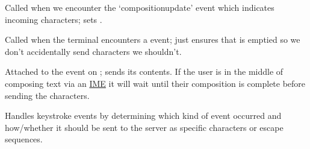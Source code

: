 \documentclass[letterpaper,10pt,openany]{sphinxmanual}
\begin{document}
\begin{fulllineitems}
\begin{fulllineitems}
\end{fulllineitems}



\begin{fulllineitems}
\label{Applications/terminal/js_terminal_input:GateOne.Terminal.Input.onCompositionUpdate}
Called when we encounter the `compositionupdate' event which indicates incoming characters; sets .

\end{fulllineitems}



\begin{fulllineitems}
\label{Applications/terminal/js_terminal_input:GateOne.Terminal.Input.onKeyUp}
Called when the terminal encounters a  event; just ensures that  is emptied so we don't accidentally send characters we shouldn't.

\end{fulllineitems}



\begin{fulllineitems}
\label{Applications/terminal/js_terminal_input:GateOne.Terminal.Input.onInput}
Attached to the  event on ; sends its contents.  If the user is in the middle of composing text via an \href{http://en.wikipedia.org/wiki/Input\_method}{IME} it will wait until their composition is complete before sending the characters.

\end{fulllineitems}



\begin{fulllineitems}
\label{Applications/terminal/js_terminal_input:GateOne.Terminal.Input.onKeyDown}
Handles keystroke events by determining which kind of event occurred and how/whether it should be sent to the server as specific characters or escape sequences.

\end{fulllineitems}




\end{fulllineitems}
\end{document}
